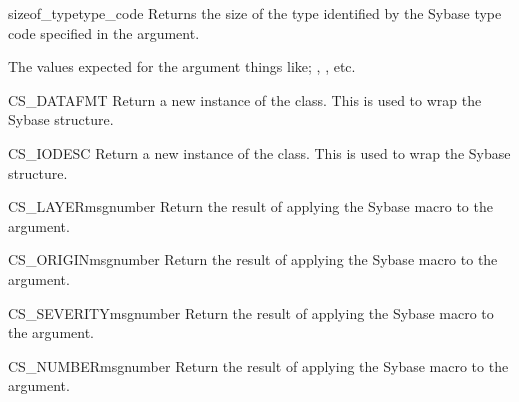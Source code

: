 \begin{funcdesc}{sizeof_type}{type_code}
Returns the size of the type identified by the Sybase type code
specified in the  argument.

The values expected for the  argument things like;
, , etc.
\end{funcdesc}

\begin{funcdesc}{CS_DATAFMT}{}
Return a new instance of the  class.  This is used
to wrap the Sybase  structure.
\end{funcdesc}

\begin{funcdesc}{CS_IODESC}{}
Return a new instance of the  class.  This is used
to wrap the Sybase  structure.
\end{funcdesc}

\begin{funcdesc}{CS_LAYER}{msgnumber}
Return the result of applying the Sybase  macro to the
 argument.
\end{funcdesc}

\begin{funcdesc}{CS_ORIGIN}{msgnumber}
Return the result of applying the Sybase  macro to the
 argument.
\end{funcdesc}

\begin{funcdesc}{CS_SEVERITY}{msgnumber}
Return the result of applying the Sybase  macro to the
 argument.
\end{funcdesc}

\begin{funcdesc}{CS_NUMBER}{msgnumber}
Return the result of applying the Sybase  macro to the
 argument.
\end{funcdesc}










